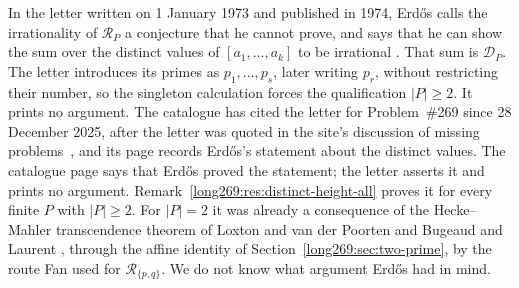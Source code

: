 In the letter written on 1 January 1973 and published in 1974, Erd\H{o}s
calls the irrationality of $\mathcal R_P$ a conjecture that he cannot prove,
and says that he can show the sum over the distinct values of
$[a_1,\ldots,a_k]$ to be irrational \cite[p.~335]{erdos1974letter}.  That
sum is $\mathcal D_P$.  The letter introduces its primes as $p_1,\ldots,p_s$,
later writing $p_r$, without restricting their number, so the singleton
calculation forces the qualification $|P|\ge2$.  It prints no argument.  The
catalogue has cited the letter for Problem~\#269 since 28 December 2025,
after the letter was quoted in the site's discussion of missing
problems~\cite{erdosproblemsmissing}, and its page records Erd\H{o}s's
statement about the distinct values.
The catalogue page says that Erd\H{o}s proved the statement; the letter
asserts it and prints no argument.
Remark~\ref{long269:res:distinct-height-all} proves it for every finite
$P$ with $|P|\ge2$.  For $|P|=2$ it was already a consequence of the
Hecke--Mahler transcendence theorem of Loxton and van der Poorten
\cite[Theorem~8, p.~40]{loxtonvdp1977} and Bugeaud and Laurent
\cite[Theorem~1.1]{bugeaudlaurent2023}, through the affine identity of
Section~\ref{long269:sec:two-prime}, by the route Fan used for
$\mathcal R_{\{p,q\}}$.  We do not know what
argument Erd\H{o}s had in mind.

